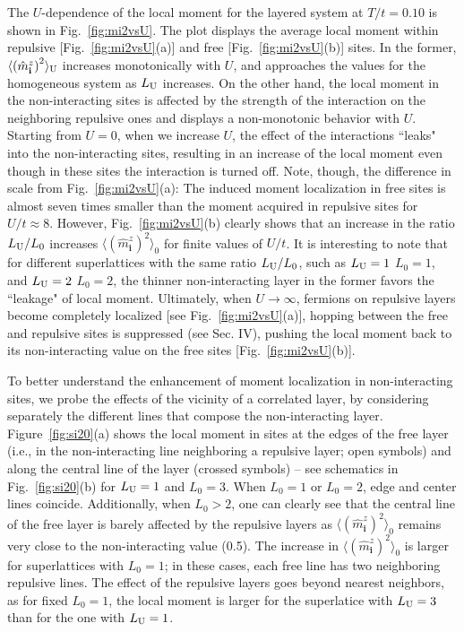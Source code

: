 \documentclass[aps,pra,reprint,twocolumn,showpacs,longbibliography,superscriptaddress]{revtex4-1}
\begin{document}
The $U$-dependence of the local moment for the  layered system at $T/t=0.10$  is shown in Fig.~\ref{fig:mi2vsU}. The plot displays the  average local moment within repulsive [Fig.~\ref{fig:mi2vsU}(a)] and free  [Fig.~\ref{fig:mi2vsU}(b)] sites. In the former, $\langle \left(\hat m_\mathbf{i}^z\right)^2\rangle_{\rm U}$ increases monotonically with $U$, and approaches the values for the homogeneous system as $L_{\rm U}$  increases. On the other hand, the local moment in the non-interacting sites is affected by the strength of the interaction on the neighboring repulsive ones and displays a non-monotonic behavior with $U$. Starting from $U=0$, when we increase $U$, the effect of the interactions ``leaks" into the non-interacting sites, resulting in an increase of the local moment even though in these sites the interaction is turned off. Note, though, the difference in scale from  Fig.~\ref{fig:mi2vsU}(a): The induced moment localization in free sites is almost seven times smaller than the moment acquired in repulsive sites for $U/t \approx 8$.  However, Fig.~\ref{fig:mi2vsU}(b) clearly shows that an increase in the ratio $L_{\rm U}/L_0$ increases $\langle \left(\hat m_\mathbf{i}^z\right)^2\rangle_0$ for finite values of $U/t$. It is interesting to note that for different superlattices with the same ratio $L_{\rm U}/L_0$, such as $L_{\rm U}=1$ $L_0=1$, and $L_{\rm U}=2$ $L_0=2$, the thinner non-interacting layer in the former favors the ``leakage" of local moment.
Ultimately, when $U \rightarrow\infty$, fermions on repulsive layers become completely localized  [see Fig.~\ref{fig:mi2vsU}(a)],
hopping between the free and repulsive sites is suppressed (see Sec. IV), pushing the local moment back to its non-interacting value on the free sites [Fig.~\ref{fig:mi2vsU}(b)].

To better understand the enhancement of moment localization in non-interacting sites, we probe the effects of the vicinity of a correlated layer, by considering separately the different lines that compose the non-interacting layer.  Figure~\ref{fig:si20}(a) shows the local moment in sites at the edges of the free layer (i.e., in the non-interacting line neighboring a repulsive layer; open symbols)  and 
along the central line of the layer (crossed symbols) -- see schematics in Fig.~\ref{fig:si20}(b) for $L_{\rm U}=1$ and $L_0=3$. When $L_0=1$ or $L_0=2$, edge and center lines coincide. Additionally, when $L_0 >2$, one can clearly see that the central line of the free layer is barely affected by the repulsive layers as  $\langle \left(\hat m_\mathbf{i}^z\right)^2\rangle_0$ remains very close to the non-interacting value (0.5). The increase in $\langle \left(\hat m_\mathbf{i}^z\right)^2\rangle_0$ is larger for superlattices with $L_0=1$; in these cases, each free line has two neighboring repulsive lines. The effect of the repulsive layers goes beyond nearest neighbors, as for fixed $L_0=1$, the local moment is larger for the superlatice with $L_{\rm U}=3$ than for the one with $L_{\rm U}=1$. 
\end{document}
